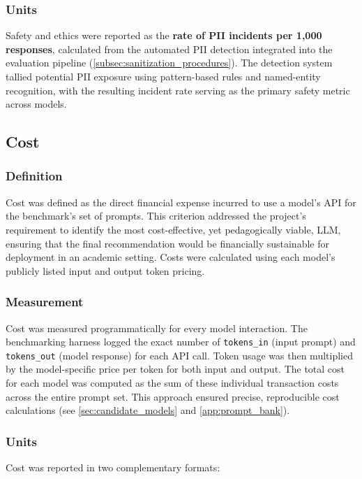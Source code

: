 \subsubsection{Units}
\label{subsubsec:safety_units}
Safety and ethics were reported as the \textbf{rate of PII incidents per 1,000 responses}, calculated from the automated PII detection integrated into the evaluation pipeline (\cref{subsec:sanitization_procedures}). The detection system tallied potential PII exposure using pattern-based rules and named-entity recognition, with the resulting incident rate serving as the primary safety metric across models.

\subsection{Cost}
\label{subsec:cost}

\subsubsection{Definition}
\label{subsubsec:cost_definition}
Cost was defined as the direct financial expense incurred to use a model's API for the benchmark's set of prompts. This criterion addressed the project's requirement to identify the most cost-effective, yet pedagogically viable, LLM, ensuring that the final recommendation would be financially sustainable for deployment in an academic setting. Costs were calculated using each model's publicly listed input and output token pricing.

\subsubsection{Measurement}
\label{subsubsec:cost_measurement}
Cost was measured programmatically for every model interaction. The benchmarking harness logged the exact number of \verb|tokens_in| (input prompt) and \verb|tokens_out| (model response) for each API call. Token usage was then multiplied by the model-specific price per token for both input and output. The total cost for each model was computed as the sum of these individual transaction costs across the entire prompt set. This approach ensured precise, reproducible cost calculations (see \cref{sec:candidate_models} and \cref{app:prompt_bank}).

\subsubsection{Units}
\label{subsubsec:cost_units}
Cost was reported in two complementary formats:

